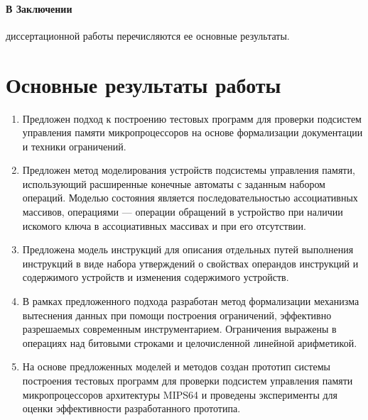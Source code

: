\documentclass[14pt,autoref,href
,facsimile
]{disser}
\begin{document}
\paragraph{В Заключении} диссертационной работы перечисляются ее основные результаты.


\section*{Основные результаты работы}
\begin{enumerate}
  \item	Предложен подход к построению тестовых программ для проверки подсистем управления памяти микропроцессоров на основе формализации документации и техники ограничений.

  \item Предложен метод моделирования устройств подсистемы управления памяти, использующий расширенные конечные автоматы с заданным набором операций. Моделью состояния является последовательностью ассоциативных массивов, операциями --- операции обращений в устройство при наличии искомого ключа в ассоциативных массивах и при его отсутствии.

  \item Предложена модель инструкций для описания отдельных путей выполнения инструкций в виде набора утверждений о свойствах операндов инструкций и содержимого устройств и изменения содержимого устройств.

  \item В рамках предложенного подхода разработан метод формализации механизма вытеснения данных при помощи построения ограничений, эффективно разрешаемых современным инструментарием. Ограничения выражены в операциях над битовыми строками и целочисленной линейной арифметикой.

  \item На основе предложенных моделей и методов создан прототип системы построения тестовых программ для проверки подсистем управления памяти микропроцессоров архитектуры MIPS64 и проведены эксперименты для оценки эффективности разработанного прототипа.
\end{enumerate}


\renewcommand\bibsection{\section*{Публикации по теме диссертации}}


\end{document}
